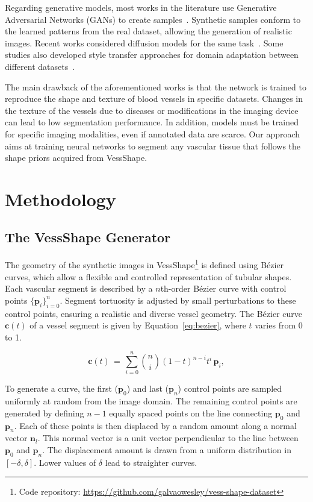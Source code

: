 \documentclass[%
reprint,
nofootinbib,
 amsmath,amssymb,
aps,
superscriptaddress,
showkeys,
longbibliography
]{revtex4-1}
\begin{document}
Regarding generative models, most works in the literature use Generative Adversarial Networks (GANs) to create samples~\cite{you2022application,andreini2021two,tavakkoli2020novel,costa2017end}. Synthetic samples conform to the learned patterns from the real dataset, allowing the generation of realistic images. Recent works considered diffusion models for the same task~\cite{go2024generation,guo2025vesseldiffusion,wang2025vastsd}. Some studies also developed style transfer approaches for domain adaptation between different datasets~\cite{peng2022unsupervised,chen2023segmentation,chen2021real}.

The main drawback of the aforementioned works is that the network is trained to reproduce the shape and texture of blood vessels in specific datasets. Changes in the texture of the vessels due to diseases or modifications in the imaging device can lead to low segmentation performance. In addition, models must be trained for specific imaging modalities, even if annotated data are scarce. Our approach aims at training neural networks to segment any vascular tissue that follows the shape priors acquired from VessShape.

\section{Methodology}
\label{s:methodology}

\subsection{The VessShape Generator}

The geometry of the synthetic images in VessShape\footnote{{Code repository}: \url{https://github.com/galvaowesley/vess-shape-dataset}} is defined using Bézier curves, which allow a flexible and controlled representation of tubular shapes. Each vascular segment is described by a $n$th-order Bézier curve with control points $\{\mathbf{p}_i\}_{i=0}^n$. Segment tortuosity is adjusted by small perturbations to these control points, ensuring a realistic and diverse vessel geometry. The Bézier curve $\mathbf{c}(t)$ of a vessel segment is given by Equation~\ref{eq:bezier}, where $t$ varies from 0 to 1.

\begin{equation}
\mathbf{c}(t) \,=\, \sum_{i=0}^{n} \binom{n}{i} (1-t)^{n-i} t^{i} \, \mathbf{p}_i,
\label{eq:bezier}
\end{equation}

To generate a curve, the first ($\mathbf{p}_0$) and last ($\mathbf{p}_n$) control points are sampled uniformly at random from the image domain. The remaining control points are generated by defining $n-1$ equally spaced points on the line connecting $\mathbf{p}_0$ and $\mathbf{p}_n$. Each of these points is then displaced by a random amount along a normal vector $\mathbf{n}_l$. This normal vector is a unit vector perpendicular to the line between $\mathbf{p}_0$ and $\mathbf{p}_n$. The displacement amount is drawn from a uniform distribution in $[-\delta,\delta]$. Lower values of $\delta$ lead to straighter curves.
\end{document}
